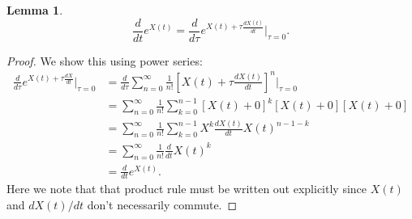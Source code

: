 \documentclass{article}
\theoremstyle{definition}
\newtheorem{lemma}{Lemma}
\newcommand{\f}[2]{\frac{#1}{#2}}
\newcommand{\lb}{\left[}
\newcommand{\rb}{\right]}
\begin{document}
\begin{enumerate}[label=(\alph*)]
	\begin{lemma}\label{lem:1}
	\begin{equation*}
	\f{d}{dt} e^{X(t)} = \f{d}{d\tau} e^{X(t) + \tau \f{dX(t)}{dt}} \bigg\vert_{\tau = 0}.
	\end{equation*}
	\end{lemma}
	\begin{proof}
		We show this using power series:
		\begin{align*}
		\f{d}{d\tau} e^{X(t) + \tau \f{dX}{dt}} \bigg\vert_{\tau = 0} 
		&= \f{d}{d\tau}\sum^\infty_{n=0} \f{1}{n!} \lb X(t) + \tau \f{dX(t)}{dt} \rb^n \bigg\vert_{\tau=0}\\
		&= \sum^\infty_{n=0} \f{1}{n!} \sum^{n-1}_{k=0} \lb X(t) + 0   \rb^k \lb X(t) + 0  \rb \lb X(t) + 0  \rb\\
		&= \sum^\infty_{n=0} \f{1}{n!} \sum^{n-1}_{k=0}X^k \f{dX(t)}{dt} X(t)^{n-1-k}\\
		&= \sum^\infty_{n=0} \f{1}{n!} \f{d}{dt} X(t)^k \\
		&= \f{d}{dt} e^{X(t)}.
		\end{align*}
		Here we note that that product rule must be written out explicitly since $X(t)$ and $dX(t)/dt$ don't necessarily commute. 
	\end{proof}


\end{enumerate}
\end{document}
